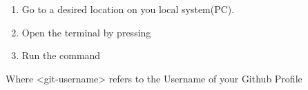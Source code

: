 \documentclass[letterpaper,10pt,english]{sphinxmanual}
\begin{document}
\begin{enumerate}
%
\setcounter{enumi}{2}
\item {} 
Go to a desired location on you local system(PC).

\item {} 
Open the terminal by pressing 

\item {} 
Run the command

\end{enumerate}

\begin{sphinxVerbatim}[commandchars=\\\{\}]
  
\end{sphinxVerbatim}

Where \textless{}git-username\textgreater{} refers to the Username of your Github Profile
\end{document}
